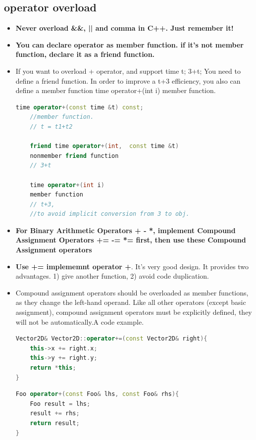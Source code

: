 \documentclass[a4paper,11pt,twoside]{book}
\begin{document}
\subsection{operator overload}
\begin{itemize}
	\item \textbf{Never overload \&\&, || and comma in C++.  Just remember it!}
	
	\item \textbf{You can declare operator as member function. if it's not member function, declare it as a friend function.}
	
		\item If you want to overload + operator, and support time t; 3+t;   You need to define a friend function. In order to improve a t+3 efficiency, you also can define a member function time operator+(int i) member function.
	\begin{lstlisting}[frame=single, language=c++]
	time operator+(const time &t) const;
	//member function.
	// t = t1+t2
	
	friend time operator+(int,  const time &t)
	nonmember friend function
	// 3+t
	
	time operator+(int i)
	member function
	// t+3,
	//to avoid implicit conversion from 3 to obj.
	\end{lstlisting}
	
	\item \textbf{For Binary Arithmetic Operators + - *, implement Compound Assignment Operators += -= *= first, then use these Compound Assignment operators}
	
	\item \textbf{Use += implememnt operator +}. It's very good design. It provides two advantages. 1) give another function, 2) avoid code duplication. 
	
	\item Compound assignment operators should be overloaded as member functions, as they change the left-hand operand. Like all other operators (except basic assignment), compound assignment operators must be explicitly defined, they will not be automatically.A code example. 
\begin{lstlisting}[frame=single, language=c++, mathescape=true]
Vector2D& Vector2D::operator+=(const Vector2D& right){
	this->x += right.x;
	this->y += right.y;
	return *this;
}
	\end{lstlisting}
	
\begin{lstlisting}[frame=single, language=c++, mathescape=true]
Foo operator+(const Foo& lhs, const Foo& rhs){
	Foo result = lhs;
	result += rhs;
	return result;
}
\end{lstlisting}
	

\end{itemize}
\end{document}
